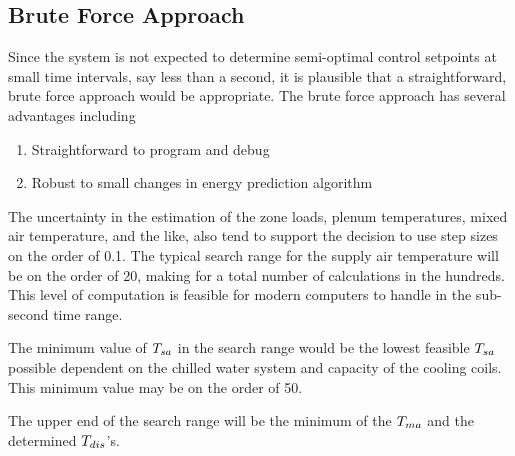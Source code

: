 
\subsection{Brute Force Approach}

Since the system is not expected to determine semi-optimal
control setpoints at small time intervals, say less than a second, it is
plausible that a straightforward, brute force approach would be
appropriate.  The brute force approach has several advantages including
\begin{enumerate}
        \item Straightforward to program and debug
        \item Robust to small changes in energy prediction algorithm
\end{enumerate}

The uncertainty in the estimation of the zone loads, plenum
temperatures, mixed air temperature, and the like, also tend to support
the decision to use step sizes on the order of  \SI{0.1}{\degreeF}. The
typical search range for the supply air temperature will be on the order
of \SI{20}{\degreeF}, making for a total number of calculations in the
hundreds.  This level of computation is feasible for modern
computers to handle in the sub-second time range.

The minimum value of \(T_{sa}\) in the search range would be the lowest
feasible \(T_{sa}\) possible dependent on the chilled water system and
capacity of the cooling coils.  This minimum value may be on the order of
\SI{50}{\degreeF}.

The upper end of the search range will be the minimum of the \(T_{ma}\)
and the determined \(T_{dis}\)'s.

